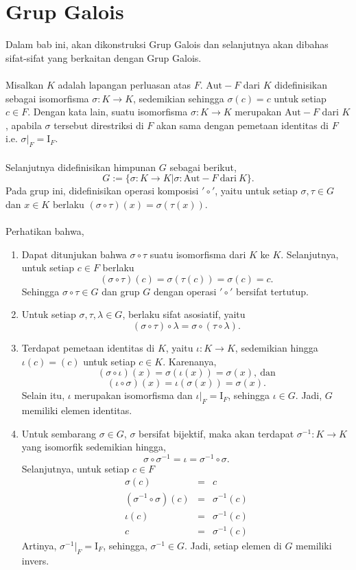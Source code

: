\chapter{Grup Galois}
	Dalam bab ini, akan dikonstruksi Grup Galois dan selanjutnya akan dibahas sifat-sifat yang berkaitan dengan Grup Galois.
\\ \\
	Misalkan $K$ adalah lapangan perluasan atas $F$. $\mathrm{Aut}-F$ dari $K$ didefinisikan sebagai isomorfisma $\sigma: K \longrightarrow K$, sedemikian sehingga $\sigma(c)=c$ untuk setiap $c\in F$. Dengan kata lain, suatu isomorfisma $\sigma: K \longrightarrow K$ merupakan $\mathrm{Aut}-F$ dari $K$, apabila $\sigma$ tersebut direstriksi di $F$ akan sama dengan pemetaan identitas di $F$ i.e. $\sigma |_F=\mathrm{I}_F.$
\\ \\ 
	Selanjutnya didefinisikan himpunan $G$ sebagai berikut,
	$$G:= \{\sigma:K\longrightarrow K | \sigma:\mathrm{Aut}-F~\mathrm{dari}~K\}.$$
	Pada grup ini, didefinisikan operasi komposisi $'\circ'$, yaitu untuk setiap $\sigma,\tau \in G$ dan $x\in K$ berlaku $(\sigma \circ\tau)(x)=\sigma(\tau(x)).$
\\ \\ 
	Perhatikan bahwa,
	\begin{enumerate}
	\item Dapat ditunjukan bahwa $\sigma \circ \tau$ suatu isomorfisma dari $K$ ke $K$. Selanjutnya, untuk setiap $c\in F$ berlaku
	$$(\sigma \circ\tau)(c)=\sigma(\tau(c))=\sigma(c)=c.$$ Sehingga $\sigma \circ \tau\in G$ dan grup $G$ dengan operasi $'\circ'$ bersifat tertutup.
	\item Untuk setiap $\sigma, \tau,\lambda \in G$, berlaku sifat asosiatif, yaitu
	$$(\sigma \circ \tau)\circ \lambda=\sigma \circ (\tau \circ \lambda).$$
	\item Terdapat pemetaan identitas di $K$, yaitu $\iota:K\longrightarrow K$, sedemikian hingga $\iota(c)=(c)$ untuk setiap $c \in K.$ Karenanya,
	$$(\sigma \circ \iota)(x)= \sigma(\iota(x))=\sigma(x),~\mathrm{dan}$$
	$$(\iota \circ \sigma)(x)= \iota(\sigma(x))=\sigma(x).$$
	Selain itu, $\iota$ merupakan isomorfisma dan $\iota |_F=\mathrm{I}_F$, sehingga $\iota \in G.$
	Jadi, $G$ memiliki elemen identitas.
	\item Untuk sembarang $\sigma \in G$, $\sigma$ bersifat bijektif, maka akan terdapat $\sigma^{-1}:K \longrightarrow K$ yang isomorfik sedemikian hingga,
	$$\sigma \circ \sigma^{-1} = \iota = \sigma^{-1} \circ \sigma.$$
	Selanjutnya, untuk setiap $c\in F$
	$$\begin{array}{rcl}
	\sigma(c) &=& c \\
	(\sigma^{-1} \circ \sigma)(c) &=& \sigma^{-1}(c)\\
	\iota (c) &=&  \sigma^{-1}(c)\\
	c &=&  \sigma^{-1}(c)
	\end{array}$$
	Artinya, $ \sigma^{-1}|_F=\mathrm{I}_F$, sehingga,  $\sigma^{-1}\in G$. Jadi, setiap elemen di $G$ memiliki invers. 
	\end{enumerate}
